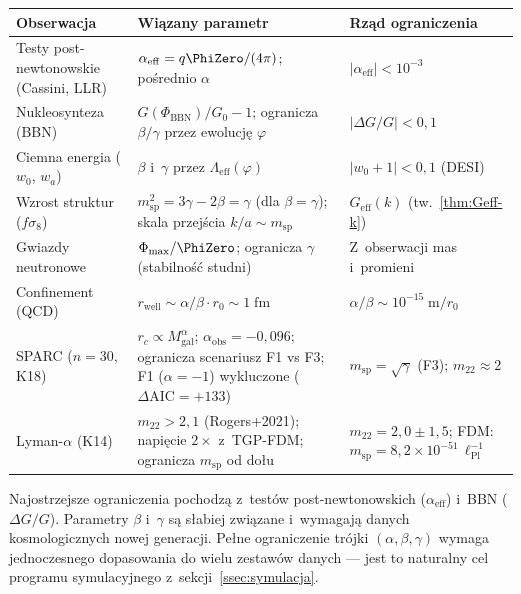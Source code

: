 \begin{center}
\small
\begin{tabular}{@{}>{\raggedright}p{3cm}p{7cm}>{\raggedright\arraybackslash}p{3.5cm}@{}}
\toprule
\textbf{Obserwacja} & \textbf{Wi\k{a}zany parametr}
  & \textbf{Rz\k{a}d ograniczenia} \\
\midrule
Testy post-newtonowskie
  (Cassini, LLR)
  & $\alpha_{\mathrm{eff}} = q\PhiZero/(4\pi)$;
    po\'srednio $\alpha$
  & $|\alpha_{\mathrm{eff}}| < 10^{-3}$ \\[4pt]
Nukleosynteza (BBN)
  & $G(\Phi_{\mathrm{BBN}})/G_0 - 1$;
    ogranicza $\beta/\gamma$ przez ewolucj\k{e} $\varphi$
  & $|\Delta G/G| < 0{,}1$ \\[4pt]
Ciemna energia
  ($w_0$, $w_a$)
  & $\beta$ i~$\gamma$ przez
    $\Lambda_{\mathrm{eff}}(\varphi)$
  & $|w_0 + 1| < 0{,}1$ (DESI) \\[4pt]
Wzrost struktur
  ($f\sigma_8$)
  & $m_{\mathrm{sp}}^2 = 3\gamma - 2\beta = \gamma$
    (dla $\beta = \gamma$);
    skala przej\'scia $k/a \sim m_{\mathrm{sp}}$
  & $G_{\mathrm{eff}}(k)$ (tw.~\ref{thm:Geff-k}) \\[4pt]
Gwiazdy neutronowe
  & $\Phi_{\mathrm{max}}/\PhiZero$; ogranicza
    $\gamma$ (stabilno\'s\'c studni)
  & Z~obserwacji mas i~promieni \\[4pt]
Confinement (QCD)
  & $r_{\mathrm{well}} \sim \alpha/\beta \cdot r_0
    \sim 1\;\mathrm{fm}$
  & $\alpha/\beta \sim 10^{-15}\;\mathrm{m}/r_0$ \\[4pt]
SPARC ($n=30$, K18)
  & $r_c \propto M_{\mathrm{gal}}^\alpha$;
    $\alpha_{\mathrm{obs}} = -0{,}096$;
    ogranicza scenariusz F1 vs F3;
    F1 ($\alpha=-1$) wykluczone ($\Delta\mathrm{AIC}=+133$)
  & $m_{\mathrm{sp}} = \sqrt{\gamma}$ (F3); $m_{22} \approx 2$ \\[4pt]
Lyman-$\alpha$ (K14)
  & $m_{22} > 2{,}1$ (Rogers+2021);
    napięcie $2\times$ z~TGP-FDM;
    ogranicza $m_{\mathrm{sp}}$ od do\l{}u
  & $m_{22} = 2{,}0 \pm 1{,}5$;
    FDM: $m_{\mathrm{sp}} = 8{,}2 \times 10^{-51}\,\ell_{\mathrm{Pl}}^{-1}$ \\
\bottomrule
\end{tabular}
\end{center}

\begin{remark}[Hierarchia wi\k{e}z\'ow]
Najostrzejsze ograniczenia pochodz\k{a} z~test\'ow
post-newtonowskich ($\alpha_{\mathrm{eff}}$) i~BBN
($\Delta G/G$). Parametry $\beta$ i~$\gamma$ s\k{a}
s\l{}abiej zwi\k{a}zane i~wymagaj\k{a} danych kosmologicznych
nowej generacji. Pe\l{}ne ograniczenie tr\'ojki
$(\alpha,\beta,\gamma)$ wymaga jednoczesnego dopasowania
do wielu zestaw\'ow danych --- jest to naturalny cel
programu symulacyjnego z~sekcji~\ref{ssec:symulacja}.
\end{remark}




